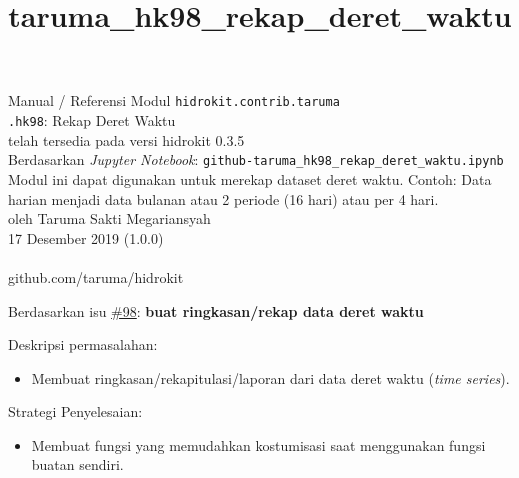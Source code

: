 \documentclass[11pt]{article}
\title{taruma\_hk98\_rekap\_deret\_waktu}
\providecommand{\tightlist}{%
      \setlength{\itemsep}{0pt}\setlength{\parskip}{0pt}}
\begin{document}
  
	\begin{titlepage}
		\vspace*{\fill}
		\begin{center}
 		\normalsize Manual / Referensi Modul \texttt{hidrokit.contrib.taruma}\\
		\huge \texttt{.hk98}: Rekap Deret Waktu\\ 
		\small telah tersedia pada versi hidrokit 0.3.5 \\[0.2cm]
      	\small Berdasarkan \emph{Jupyter Notebook}: \texttt{github-taruma\_hk98\_rekap\_deret\_waktu.ipynb} \\[0.5cm]
      	\small Modul ini dapat digunakan untuk merekap dataset deret waktu. Contoh: Data harian menjadi data bulanan atau 2 periode (16 hari) atau per 4 hari. \\[0.5cm]
		\normalsize oleh Taruma Sakti Megariansyah\\[0.5cm]
      	\normalsize 17 Desember 2019 (1.0.0)\\[1cm]
    	\\
      	\normalsize github.com/taruma/hidrokit
		\end{center}
    	\vspace*{\fill}
	\end{titlepage}
    
    

    
    

    Berdasarkan isu
\href{https://github.com/taruma/hidrokit/issues/98}{\#98}: \textbf{buat
ringkasan/rekap data deret waktu}

Deskripsi permasalahan:

\begin{itemize}
\tightlist
\item
  Membuat ringkasan/rekapitulasi/laporan dari data deret waktu
  (\emph{time series}).
\end{itemize}

Strategi Penyelesaian:

\begin{itemize}
\tightlist
\item
  Membuat fungsi yang memudahkan kostumisasi saat menggunakan fungsi
  buatan sendiri.
\end{itemize}
\end{document}
